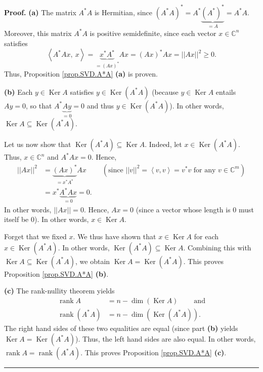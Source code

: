 \documentclass[numbers=enddot,12pt,final,onecolumn,notitlepage]{scrartcl}%
\numberwithin{exer}{subsection}
\theoremstyle{definition}
\newenvironment{proof}[1][Proof]{\noindent\textbf{#1.} }{\ \rule{0.5em}{0.5em}}
\begin{document}
\begin{proof}
\textbf{(a)} The matrix $A^{\ast}A$ is Hermitian, since $\left(  A^{\ast
}A\right)  ^{\ast}=A^{\ast}\underbrace{\left(  A^{\ast}\right)  ^{\ast}}%
_{=A}=A^{\ast}A$. Moreover, this matrix $A^{\ast}A$ is positive semidefinite,
since each vector $x\in\mathbb{C}^{n}$ satisfies%
\[
\left\langle A^{\ast}Ax,\ x\right\rangle =\underbrace{x^{\ast}A^{\ast}%
}_{=\left(  Ax\right)  ^{\ast}}Ax=\left(  Ax\right)  ^{\ast}Ax=\left\vert
\left\vert Ax\right\vert \right\vert ^{2}\geq0.
\]
Thus, Proposition \ref{prop.SVD.A*A} \textbf{(a)} is proven. \medskip

\textbf{(b)} Each $y\in\operatorname*{Ker}A$ satisfies $y\in
\operatorname*{Ker}\left(  A^{\ast}A\right)  $ (because $y\in
\operatorname*{Ker}A$ entails $Ay=0$, so that $A^{\ast}\underbrace{Ay}_{=0}=0$
and thus $y\in\operatorname*{Ker}\left(  A^{\ast}A\right)  $). In other words,
$\operatorname*{Ker}A\subseteq\operatorname*{Ker}\left(  A^{\ast}A\right)  $.

Let us now show that $\operatorname*{Ker}\left(  A^{\ast}A\right)
\subseteq\operatorname*{Ker}A$. Indeed, let $x\in\operatorname*{Ker}\left(
A^{\ast}A\right)  $. Thus, $x\in\mathbb{C}^{n}$ and $A^{\ast}Ax=0$. Hence,
\begin{align*}
\left\vert \left\vert Ax\right\vert \right\vert ^{2} &  =\underbrace{\left(
Ax\right)  ^{\ast}}_{=x^{\ast}A^{\ast}}Ax\ \ \ \ \ \ \ \ \ \ \left(
\text{since }\left\vert \left\vert v\right\vert \right\vert ^{2}=\left\langle
v,v\right\rangle =v^{\ast}v\text{ for any }v\in\mathbb{C}^{m}\right)  \\
&  =x^{\ast}\underbrace{A^{\ast}Ax}_{=0}=0.
\end{align*}
In other words, $\left\vert \left\vert Ax\right\vert \right\vert =0$. Hence,
$Ax=0$ (since a vector whose length is $0$ must itself be $0$). In other
words, $x\in\operatorname*{Ker}A$.

Forget that we fixed $x$. We thus have shown that $x\in\operatorname*{Ker}A$
for each $x\in\operatorname*{Ker}\left(  A^{\ast}A\right)  $. In other words,
$\operatorname*{Ker}\left(  A^{\ast}A\right)  \subseteq\operatorname*{Ker}A$.
Combining this with $\operatorname*{Ker}A\subseteq\operatorname*{Ker}\left(
A^{\ast}A\right)  $, we obtain $\operatorname*{Ker}A=\operatorname*{Ker}%
\left(  A^{\ast}A\right)  $. This proves Proposition \ref{prop.SVD.A*A}
\textbf{(b)}. \medskip

\textbf{(c)} The rank-nullity theorem yields%
\begin{align*}
\operatorname*{rank}A  &  =n-\dim\left(  \operatorname*{Ker}A\right)
\ \ \ \ \ \ \ \ \ \ \text{and}\\
\operatorname*{rank}\left(  A^{\ast}A\right)   &  =n-\dim\left(
\operatorname*{Ker}\left(  A^{\ast}A\right)  \right)  .
\end{align*}
The right hand sides of these two equalities are equal (since part
\textbf{(b)} yields $\operatorname*{Ker}A=\operatorname*{Ker}\left(  A^{\ast
}A\right)  $). Thus, the left hand sides are also equal. In other words,
$\operatorname*{rank}A=\operatorname*{rank}\left(  A^{\ast}A\right)  $. This
proves Proposition \ref{prop.SVD.A*A} \textbf{(c)}.
\end{proof}
\end{document}
